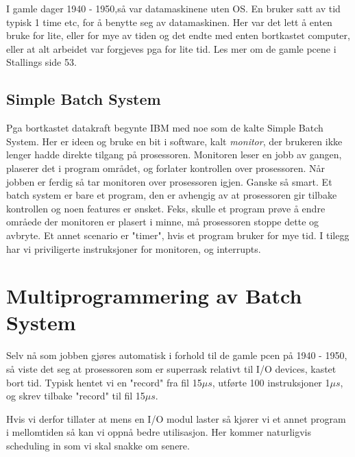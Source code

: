 I gamle dager 1940 - 1950,så var datamaskinene uten OS. En bruker satt av tid typisk 1 time etc, for å benytte seg av datamaskinen. Her var det lett å enten bruke for lite, eller for mye av tiden og det endte med enten bortkastet computer, eller at alt arbeidet var forgjeves pga for lite tid.
Les mer om de gamle pcene i Stallings side 53.
\subsection{Simple Batch System}
Pga bortkastet datakraft begynte IBM med noe som de kalte Simple Batch System. Her er ideen og bruke en bit i software, kalt \emph{monitor}, der brukeren ikke lenger hadde direkte tilgang på prosessoren. Monitoren leser en jobb av gangen, plaserer det i program området, og forlater kontrollen over prosessoren. Når jobben er ferdig så tar monitoren over prosessoren igjen. Ganske så smart.
Et batch system er bare et program, den er avhengig av at prosessoren gir tilbake kontrollen og noen features er ønsket. 
Feks, skulle et program prøve å endre områede der monitoren er plasert i minne, må prosessoren stoppe dette og avbryte. Et annet scenario er "timer", hvis et program bruker for mye tid. I tilegg har vi priviligerte instruksjoner for monitoren, og interrupts.

\section{Multiprogrammering av Batch System}
Selv nå som jobben gjøres automatisk i forhold til de gamle pcen på 1940 - 1950, så viste det seg at prosessoren som er superrask relativt til I/O devices, kastet bort tid. Typisk hentet vi en "record" fra fil 15$\mu s$, utførte 100 instruksjoner 1$\mu s$, og skrev tilbake "record" til fil 15$\mu s$. 

Hvis vi derfor tillater at mens en I/O modul laster så kjører vi et annet program i mellomtiden så kan vi oppnå bedre utilisasjon. Her kommer naturligvis scheduling in som vi skal snakke om senere. 

